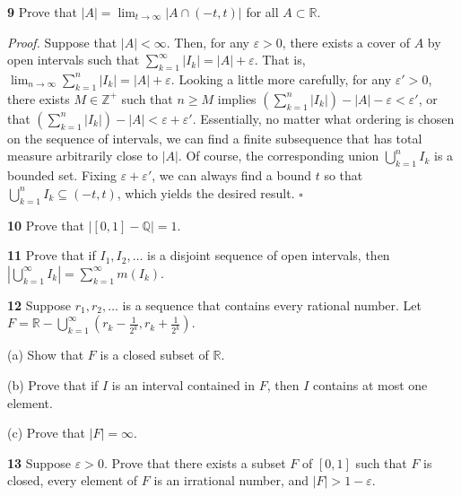\documentclass[a4paper]{article}
\newcommand{\R}{\mathbb{R}}
\newcommand{\Q}{\mathbb{Q}}
\newcommand{\Z}{\mathbb{Z}}
\begin{document}
\textbf{9} Prove that $|A| = \lim_{t \to \infty} |A \cap (-t, t)|$ for all $A \subset \R$.

\emph{Proof.} Suppose that $|A| < \infty$. Then, for any $\varepsilon > 0$, there exists a cover of $A$ by open intervals such that $\displaystyle \sum_{k=1}^\infty |I_k| = |A| + \varepsilon$. That is, $\displaystyle \lim_{n \to \infty} \sum_{k=1}^n |I_k| = |A| + \varepsilon$. Looking a little more carefully, for any $\varepsilon' > 0$, there exists $M \in \Z^+$ such that $n \geq M$ implies $\displaystyle \left(\sum_{k=1}^n |I_k|\right) - |A| - \varepsilon < \varepsilon'$, or that $\displaystyle \left(\sum_{k=1}^n |I_k|\right) - |A| < \varepsilon + \varepsilon'$. Essentially, no matter what ordering is chosen on the sequence of intervals, we can find a finite subsequence that has total measure arbitrarily close to $|A|$. Of course, the corresponding union $\bigcup_{k=1}^n I_k$ is a bounded set. Fixing $\varepsilon + \varepsilon'$, we can always find a bound $t$ so that $\bigcup_{k=1}^n I_k \subseteq (-t, t)$, which yields the desired result. $\square$

\textbf{10} Prove that $|[0, 1] - \Q| = 1$.

\textbf{11} Prove that if $I_1, I_2, \ldots$ is a disjoint sequence of open intervals, then $\left|\bigcup_{k=1}^\infty I_k\right| = \sum_{k=1}^\infty m(I_k)$.

\textbf{12} Suppose $r_1, r_2, \ldots$ is a sequence that contains every rational number. Let $F = \R - \bigcup_{k=1}^\infty \left(r_k - \frac{1}{2^k}, r_k + \frac{1}{2^k}\right)$.

(a) Show that $F$ is a closed subset of $\R$.

(b) Prove that if $I$ is an interval contained in $F$, then $I$ contains at most one element.

(c) Prove that $|F| = \infty$.

\textbf{13} Suppose $\varepsilon > 0$. Prove that there exists a subset $F$ of $[0, 1]$ such that $F$ is closed, every element of $F$ is an irrational number, and $|F| > 1 - \varepsilon$.
\end{document}

